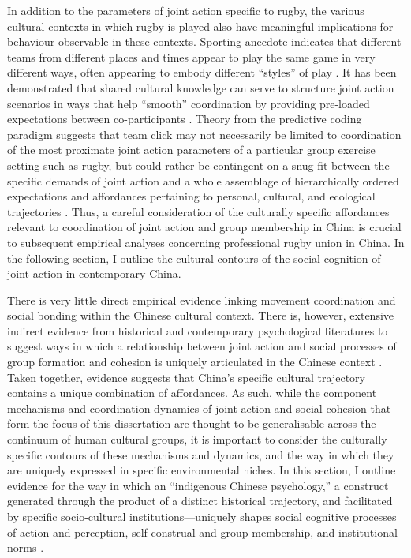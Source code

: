 \begin{CJK}{UTF8}{gbsn}
In addition to the parameters of joint action specific to rugby, the various cultural contexts in which rugby is played also have meaningful implications for behaviour observable in these contexts.  Sporting anecdote indicates that different teams from different places and times appear to play the same game in very different ways, often appearing to embody different ``styles'' of play \citep{Bourdieu1990,Taylor2010}.  It has been demonstrated that shared cultural knowledge can serve to structure joint action scenarios in ways that help ``smooth'' coordination by providing pre-loaded expectations between co-participants \citep{Vesper2017}.  Theory from the predictive coding paradigm suggests that team click may not necessarily be limited to coordination of the most proximate joint action parameters of a particular group exercise setting such as rugby, but could rather be contingent on a snug fit between the specific demands of joint action and a whole assemblage of hierarchically ordered expectations and affordances pertaining to personal, cultural, and ecological trajectories \citep{Clark2013}.  Thus, a careful consideration of the culturally specific affordances relevant to coordination of joint action and group membership in China is crucial to subsequent empirical analyses concerning professional rugby union in China. In the following section, I outline the cultural contours of the social cognition of joint action in contemporary China.


There is very little direct empirical evidence linking movement coordination and social bonding within the Chinese cultural context. There is, however, extensive indirect evidence from historical and contemporary psychological literatures to suggest ways in which a relationship between joint action and social processes of group formation and cohesion is uniquely articulated in the Chinese context \citep{Weed2011}.  Taken together, evidence suggests that China's specific cultural trajectory contains a unique combination of affordances.  As such, while the component mechanisms and coordination dynamics of joint action and social cohesion that form the focus of this dissertation are thought to be generalisable across the continuum of human cultural groups, it is important to consider the culturally specific contours of these mechanisms and dynamics, and the way in which they are uniquely expressed in specific environmental niches.  In this section, I outline evidence for the way in which an ``indigenous Chinese psychology,'' a construct generated through the product of a distinct historical trajectory, and facilitated by specific socio-cultural institutions---uniquely shapes social cognitive processes of action and perception, self-construal and group membership, and institutional norms \citep{Liu2009}.



\end{CJK}
